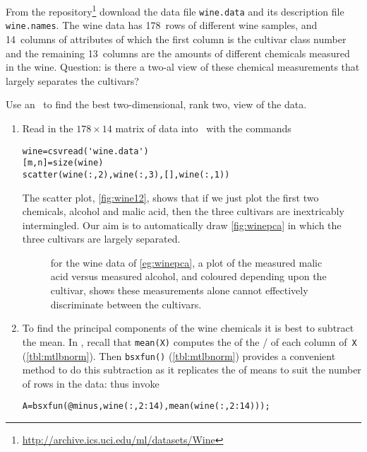 \begin{example} \label{eg:winepca}
From the \cite{Lichman2013} repository\footnote{\url{http://archive.ics.uci.edu/ml/datasets/Wine}} download the data file \verb|wine.data| and its description file \verb|wine.names|.
The wine data has 178~rows of different wine samples, and 14~columns of attributes of which the first column is the cultivar class number and the remaining 13~columns are the amounts of different chemicals measured in the wine.
Question: is there a two-al view of these chemical measurements that largely separates the cultivars?

\begin{solution} 
Use an \svd\ to find the best two-dimensional, rank two, view of the data.
\begin{enumerate}
\item Read in the \(178\times14\) matrix of data into \script\ with the commands
\begin{verbatim}
wine=csvread('wine.data')
[m,n]=size(wine)
scatter(wine(:,2),wine(:,3),[],wine(:,1))
\end{verbatim}
\setbox\ajrqrbox\hbox{}%
\marginpar{\usebox{\ajrqrbox\\[2ex]}}%
The scatter plot, \autoref{fig:wine12}, shows that if we just plot the first two chemicals, alcohol and malic acid, then the three cultivars are inextricably intermingled.
Our aim is to automatically draw \autoref{fig:winepca} in which the three cultivars are largely separated.
\begin{figure}
\centering

\caption{for the wine data of \autoref{eg:winepca}, a plot of the measured malic acid versus measured alcohol, and coloured depending upon the cultivar, shows these measurements alone cannot effectively discriminate between the cultivars.}
\label{fig:wine12}
\end{figure}


\item To find the principal components of the wine chemicals it is best to subtract the mean.
In \script, recall that \verb|mean(X)| computes the  of the \slash {} of each column of~\verb|X| (\autoref{tbl:mtlbnorm}).
Then \verb|bsxfun()| (\autoref{tbl:mtlbnorm}) provides a convenient method to do this subtraction as it replicates the  of means to suit the number of rows in the data: thus invoke
\begin{verbatim}
A=bsxfun(@minus,wine(:,2:14),mean(wine(:,2:14)));
\end{verbatim}


\end{enumerate}
\end{solution}
\end{example}
